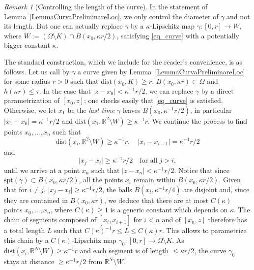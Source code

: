 \documentclass[12pt]{article}
\theoremstyle{definition}
\theoremstyle{remark}
\newtheorem{remark}[theorem]{Remark}
\numberwithin{equation}{section}
\newcommand{\abs}[1]{\lvert #1 \rvert}
\newcommand{\R}{\mathbb{R}}
\newcommand{\spt}{\mathrm{spt}}
\begin{document}
\begin{remark}[Controlling the length of the curve]\label{rmk_curve}
    In the statement of Lemma~\ref{LemmaCurvaPreliminareLoc}, we only control the diameter of $\gamma$ and not
    its length. But one can actually replace $\gamma$ by a $\kappa$-Lipschitz map $\gamma : [0,r] \longrightarrow W$,
    where $W:=(\Omega\setminus K)\cap B(x_0,\kappa r/2)$,
    satisfying \eqref{eq_curve} with a potentially bigger constant $\kappa$.

    The standard construction, which we include for the reader's convenience, is as follows. Let us call by $\gamma$ a
    curve given by Lemma~\ref{LemmaCurvaPreliminareLoc} for some radius $r > 0$ such that $\mathrm{dist}(x_0,K)
    \geq r$, $B(x_0,\kappa r) \subset \Omega$ and $h(\kappa r) \leq \tau$. In the case that $\abs{z - x_0} < \kappa^{-1} r/2$, we can
    replace $\gamma$ by a direct parametrization of $[x_0,z]$; one checks easily that \eqref{eq_curve} is satisfied.
    Otherwise, we let $x_1$ be the \emph{last time}
    $\gamma$ leaves $B(x_0,\kappa^{-1} r/2)$, in particular $\abs{x_1 - x_0} = \kappa^{-1} r/2$ and
    $\mathrm{dist}(x_1,\R^2 \setminus W) \geq \kappa^{-1} r$.
    We continue the process to find points $x_0,\ldots,x_n$ such that 
    \begin{equation}
        \mathrm{dist}(x_i,\R^2 \setminus W) \geq \kappa^{-1} r,
        \quad
        \abs{x_i - x_{i-1}} = \kappa^{-1} r/2
    \end{equation}
    and
    \begin{equation}
        \abs{x_j - x_i} \geq \kappa^{-1} r /2 \quad \text{for all} \; j > i,
    \end{equation}
    until we arrive at a point $x_n$ such that $\abs{z - x_n} < \kappa^{-1} r/2$. Notice that since $\spt(\gamma)
    \subset B(x_0,\kappa r/2)$, all the points $x_i$ remain within $B(x_0,\kappa r/2)$. Given that for $i \ne j$,
    $\abs{x_j - x_i} \geq \kappa^{-1} r /2$, the balls $B(x_i,\kappa^{-1}r/4)$ are disjoint and, since they are
    contained in $B(x_0,\kappa r)$, we deduce that there are at most $C(\kappa)$ points $x_0,\ldots,x_n$, where
    $C(\kappa) \geq 1$ is a generic constant which depends on $\kappa$. 
    The chain of segments composed of $[x_i,x_{i+1}]$ for $i < n$ and of $[x_n,z]$ therefore has a total length $L$ such that
    $C(\kappa)^{-1} r \leq L \leq C(\kappa) r$. This allows to
    parametrize this chain by a $C(\kappa)$-Lipschitz map $\gamma_0 : [0,r] \longrightarrow \Omega
    \setminus K$. As $\mathrm{dist}(x_i,\R^N \setminus W) \geq \kappa^{-1} r$ and each segment is of length $\leq
    \kappa r/2$, the curve $\gamma_0$ stays at distance $\geq \kappa^{-1} r /2$ from $\R^N \setminus W$.
\end{remark}
\end{document}
